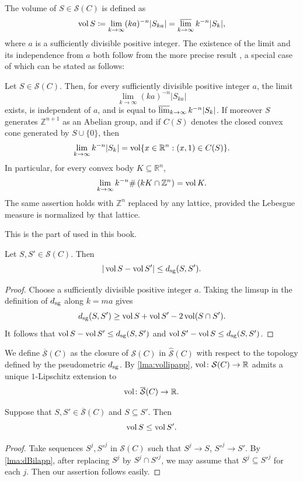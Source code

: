 The volume of $S\in \mathcal{S}(C)$ is defined as
\[
\operatorname{vol} S\coloneqq \lim_{k\to\infty} (ka)^{-n}|S_{ka}|=\varlimsup_{k\to\infty} k^{-n}|S_k|,
\]
where $a$ is a sufficiently divisible positive integer.
The existence of the limit and its independence from $a$ both follow from the more precise result \cite[Theorem~2]{KK12}, a special case of which can be stated as follows:
\begin{theorem}\label{thm:KK12growth}
    Let $S\in \mathcal{S}(C)$. Then, for every sufficiently divisible positive integer $a$, the limit
    \[
        \lim_{k\to\infty}(ka)^{-n}|S_{ka}|
    \]
    exists, is independent of $a$, and is equal to $\varlimsup_{k\to\infty} k^{-n}|S_k|$.
    If moreover $S$ generates $\mathbb{Z}^{n+1}$ as an Abelian group, and if $C(S)$ denotes the closed convex cone generated by $S\cup\{0\}$, then
    \[
        \lim_{k\to\infty} k^{-n}|S_k|
        =
        \operatorname{vol} \{x\in \mathbb{R}^n:(x,1)\in C(S)\}.
    \]
    In particular, for every convex body $K\subseteq \mathbb{R}^n$,
    \[
        \lim_{k\to\infty} k^{-n}\#\left(kK\cap \mathbb{Z}^n\right)=\operatorname{vol} K.
    \]
    The same assertion holds with $\mathbb{Z}^n$ replaced by any lattice, provided the Lebesgue measure is normalized by that lattice.
\end{theorem}
This is the part of \cite[Theorem~2]{KK12} used in this book.
\begin{lemma}\label{lma:vollipapp}
    Let $S,S'\in \mathcal{S}(C)$. Then
    \[
    |\operatorname{vol} S-\operatorname{vol} S'|\leq d_{\mathrm{sg}}(S,S').
    \]
\end{lemma}
\begin{proof}
    Choose a sufficiently divisible positive integer $a$. Taking the limsup in the definition of $d_{\mathrm{sg}}$ along $k=ma$ gives
    \[
        d_{\mathrm{sg}}(S,S')\geq \operatorname{vol} S+\operatorname{vol} S'-2\operatorname{vol}(S\cap S').
    \]
    It follows that $\operatorname{vol} S-\operatorname{vol} S'\leq d_{\mathrm{sg}}(S,S')$ and $\operatorname{vol} S'-\operatorname{vol} S\leq d_{\mathrm{sg}}(S,S')$.
\end{proof}
We define $\overline{\mathcal{S}}(C)$ as the closure of $\mathcal{S}(C)$ in $\hat{\mathcal{S}}(C)$ with respect to the topology defined by the pseudometric $d_{\mathrm{sg}}$.
By \cref{lma:vollipapp}, $\operatorname{vol}\colon \mathcal{S}(C)\rightarrow \mathbb{R}$ admits a unique $1$-Lipschitz extension to
\begin{equation}\label{eq:volexapp}
\operatorname{vol}\colon \overline{\mathcal{S}}(C)\rightarrow \mathbb{R}.
\end{equation}
\begin{lemma}\label{lma:volcompaapp}
    Suppose that $S,S'\in \overline{\mathcal{S}}(C)$ and $S\subseteq S'$. Then
    \[
    \operatorname{vol} S\leq \operatorname{vol} S'.
    \]
\end{lemma}
\begin{proof}
    Take sequences $S^j,S'^j$ in $\mathcal{S}(C)$ such that $S^j\to S$, $S'^j\to S'$. By \cref{lma:dBilapp}, after replacing $S^j$ by $S^j\cap S'^j$, we may assume that $S^j\subseteq S'^j$ for each $j$. Then our assertion follows easily.
\end{proof}




